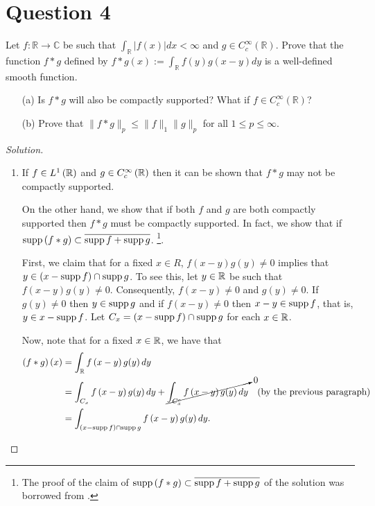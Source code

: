 \section{Question 4}
\horz
 Let $f:\mathbb{R}\to\mathbb{C}$ be such that $\int_{\mathbb{R}}|f(x)|dx<\infty$ and $g\in C_c^\infty(\mathbb{R})$. Prove that the function $f*g$ defined by $f*g(x):=\int_{\mathbb{R}}f(y)g(x-y)dy$ is a well-defined smooth function.
\begin{itemize}
\item[(a)] Is $f*g$ will also be compactly supported? What if $f\in C_c^\infty(\mathbb R)$? 
\item[(b)] Prove that $\|f*g\|_p\leq \|f\|_1\|g\|_p$ for all $1\leq p\leq \infty.$
\end{itemize}
\horz

\begin{proof}[Solution]
\begin{enumerate}[label=(\alph*)]
\item  If $f \in L^{1} \left( \mathbb R \right)$ and $g \in C_{c} ^{\infty} \left( \mathbb R \right)$ then it can be shown that $f * g$ may not be compactly supported.

On the other hand, we show that if both $f$ and $g$ are both compactly supported then $f * g $ must be compactly supported. In fact, we show that if $\operatorname{supp} \left( f * g \right) \subset \overline{\operatorname{supp} f + \operatorname{supp} g}$. \footnote{The proof of the claim of $\operatorname{supp} \left( f *g \right) \subset \overline{\operatorname{supp} f + \operatorname{supp} g}$ of the solution was borrowed from \cite{MR2759829}.}.

First, we claim that for a fixed $x\in R$, $f\left( x-y \right) g\left( y \right) \ne 0$ implies that $y \in \left( x- \operatorname{supp} f \right) \cap \operatorname{supp} g$. To see this, let $y\in \mathbb R$ be such that $f\left( x-y \right) g(y) \ne 0$. Consequently, $f\left( x-y \right) \ne 0$ and $g\left( y \right) \ne 0$. If $g\left( y \right) \ne 0$ then $y \in \operatorname{supp} g$ and if $f\left( x-y \right) \ne 0$ then $x-y \in \operatorname{supp} f$, that is, $y \in x - \operatorname{supp} f$. Let $C_{x} = \left( x- \operatorname{supp} f \right) \cap \operatorname{supp} g$ for each $x\in \mathbb R$. 

Now, note that for a fixed $x\in \mathbb R$, we have that
\begin{align*}
\left( f * g \right) \left( x \right) &= \int_{\mathbb R} f\left( x-y \right) g(y) \, dy \\
&= \int_{C_{x}} f\left( x-y \right) g(y) \, dy + \cancelto{0}{\int_{C_{x}^{c}} f\left( x-y \right) g(y) \, dy} & (\text{by the previous paragraph})\\
&= \int_{\left( x- \operatorname{supp} f \right) \cap \operatorname{supp} g} f\left( x-y \right) g(y) \, dy.
\end{align*}


\end{enumerate}
\end{proof}
